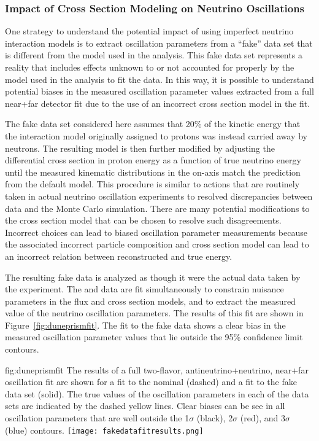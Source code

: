 \subsubsection{Impact of Cross Section Modeling on Neutrino Oscillations}

One strategy to understand the potential impact of using imperfect neutrino interaction models is to extract oscillation parameters from a ``fake'' data set that is different from the model used in the analysis.  This fake data set represents a reality that includes effects unknown to or not accounted for properly by the model used in the analysis to fit the data. In this way, it is possible to understand potential biases in the measured oscillation parameter values extracted from a full near+far detector fit due to the use of an incorrect cross section model in the fit. 


The fake data set considered here assumes that 20\% of the kinetic energy that the interaction model originally assigned to protons was instead carried away by neutrons. The resulting model is then further modified by adjusting the differential cross section in proton energy as a function of true neutrino energy until the measured kinematic distributions in the on-axis   match the prediction from the default model. This procedure is similar to actions that are routinely taken in actual neutrino oscillation experiments to resolved discrepancies between   data and the Monte Carlo simulation. There are many potential modifications to the cross section model that can be chosen to resolve such disagreements. Incorrect choices can lead to biased oscillation parameter measurements because the associated incorrect particle composition and cross section model can lead to an incorrect relation between reconstructed and true energy.



The resulting fake data is analyzed as though it were the actual data taken by the experiment. The  and   data are fit simultaneously  to constrain nuisance parameters in the flux and cross section models, and to extract the measured value of the neutrino oscillation parameters. The results of this fit are shown in Figure~\ref{fig:duneprismfit}. The fit to the fake data shows a clear bias in the measured oscillation parameter values that lie outside the 95\% confidence limit contours.


\begin{dunefigure}{fig:duneprismfit}
{The results of a full two-flavor, antineutrino+neutrino, near+far oscillation fit are shown for a fit to the nominal  (dashed) and a fit to the fake data set (solid). The true values of the oscillation parameters in each of the data sets are indicated by the dashed yellow lines. Clear biases can be see in all oscillation parameters that are well outside the 1$\sigma$ (black), 2$\sigma$ (red), and 3$\sigma$ (blue) contours.}
      \texttt{[image: fakedatafitresults.png]}
\end{dunefigure}


